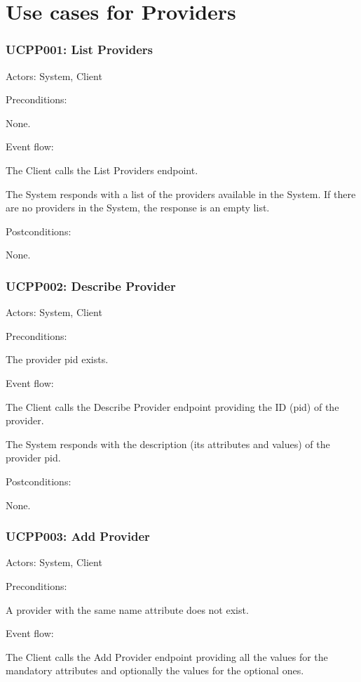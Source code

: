 \section{Use cases for Providers}

\subsubsection{UCPP001: List Providers}
\label{UCPP001}

Actors: System, Client

Preconditions: 

\ucitem None.

Event flow:

\ucitem The Client calls the List Providers endpoint.

\ucitem The System responds with a list of the providers available in the System. If there are no providers in the System, the response is an empty list.

Postconditions: 

\ucitem None.

\subsubsection{UCPP002: Describe Provider}
\label{UCPP002}

Actors: System, Client

Preconditions: 

\ucitem The provider pid exists.

Event flow:

\ucitem The Client calls the Describe Provider endpoint providing the ID (pid) of the provider.

\ucitem The System responds with the description (its attributes and values) of the provider pid.

Postconditions:

\ucitem None.

\subsubsection{UCPP003: Add Provider}
\label{UCPP003}

Actors: System, Client

Preconditions: 

\ucitem A provider with the same name attribute does not exist.

Event flow:

\ucitem The Client calls the Add Provider endpoint providing all the values for the mandatory attributes and optionally the values for the optional ones.

